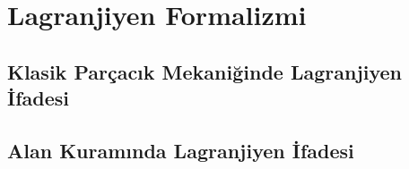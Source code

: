 \chapter{Lagranjiyen Formalizmi}
\section{Klasik Parçacık Mekaniğinde Lagranjiyen İfadesi}
\section{Alan Kuramında Lagranjiyen İfadesi}
